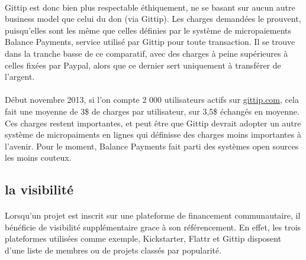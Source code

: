 \paragraph{}
Gittip est donc bien plus respectable éthiquement, ne se basant sur aucun autre
business model que celui du don (via Gittip). Les charges demandées le
prouvent, puisqu'elles sont les même que celles définies par le système de
micropaiements Balance Payments, service utilisé par Gittip pour toute
transaction. Il se trouve dans la tranche basse de ce comparatif, avec des
charges à peine supérieures à celles fixées par Paypal, alors que ce dernier
sert uniquement à transférer de l'argent.
\newpage

\begin{figure}[!t]
\end{figure}

\paragraph{}
Début novembre 2013, si l'on compte 2 000 utilisateurs actifs sur
\url{gittip.com}, cela fait une moyenne de 3\${} de charges par utilisateur,
sur 3,5\${} échangés en moyenne. Ces charges restent importantes, et peut être
que Gittip devrait adopter un autre système de micropaiments en lignes qui
définisse des charges moins importantes à l'avenir. Pour le moment, Balance
Payments fait parti des systèmes open sources les moins couteux.

\subsection{la visibilité}

\paragraph{}
Lorsqu'un projet est inscrit sur une plateforme de financement communautaire,
il bénéficie de visibilité supplémentaire grace à son référencement. En effet,
les trois plateformes utilisées comme exemple, Kickstarter, Flattr et Gittip
disposent d'une liste de membres ou de projets classés par popularité.

